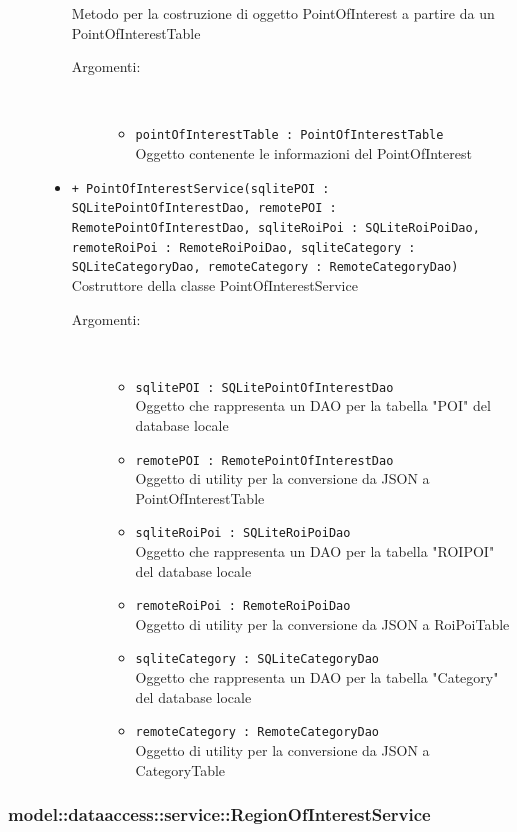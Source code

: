 \documentclass[../DefinizioneDiProdotto.tex]{subfiles}
\begin{document}
\begin{description}
\begin{itemize}
Metodo per la costruzione di oggetto PointOfInterest a partire da un PointOfInterestTable
 \begin{description}
\item[Argomenti:] \
\begin{itemize}
\item \texttt{pointOfInterestTable : PointOfInterestTable}\\
Oggetto contenente le informazioni del PointOfInterest\end{itemize}
\end{description}
\item \texttt{+ PointOfInterestService(sqlitePOI : SQLitePointOfInterestDao, remotePOI : RemotePointOfInterestDao, sqliteRoiPoi : SQLiteRoiPoiDao, remoteRoiPoi : RemoteRoiPoiDao, sqliteCategory : SQLiteCategoryDao, remoteCategory : RemoteCategoryDao)}\\
Costruttore della classe PointOfInterestService
 \begin{description}
\item[Argomenti:] \
\begin{itemize}
\item \texttt{sqlitePOI : SQLitePointOfInterestDao}\\
Oggetto che rappresenta un DAO per la tabella "POI" del database locale\item \texttt{remotePOI : RemotePointOfInterestDao}\\
Oggetto di utility per la conversione da JSON a PointOfInterestTable\item \texttt{sqliteRoiPoi : SQLiteRoiPoiDao}\\
Oggetto che rappresenta un DAO per la tabella "ROIPOI" del database locale\item \texttt{remoteRoiPoi : RemoteRoiPoiDao}\\
Oggetto di utility per la conversione da JSON a RoiPoiTable\item \texttt{sqliteCategory : SQLiteCategoryDao}\\
Oggetto che rappresenta un DAO per la tabella "Category" del database locale\item \texttt{remoteCategory : RemoteCategoryDao}\\
Oggetto di utility per la conversione da JSON a CategoryTable\end{itemize}
\end{description}
\end{itemize}
\end{description}

\subsubsection{model::dataaccess::service::RegionOfInterestService}
\end{document}
